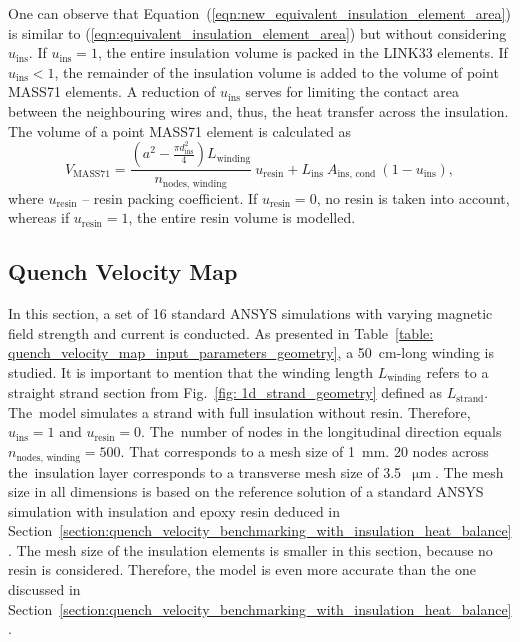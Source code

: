 One can observe that Equation~(\ref{eqn:new_equivalent_insulation_element_area}) is similar to (\ref{eqn:equivalent_insulation_element_area}) but without considering $u_\text{ins}$. If $u_\text{ins} = 1$, the entire insulation volume is packed in the LINK33 elements. If $u_\text{ins} < 1$, the remainder of the insulation volume is added to the volume of point MASS71 elements. A reduction of $u_\text{ins}$ serves for limiting the contact area between the neighbouring wires and, thus, the heat transfer across the insulation. The volume of a point MASS71 element is calculated as 
\begin{equation}
    V_\text{MASS71} = \frac{\left( a^2 - \frac{\pi d_\text{ins}^2}{4} \right) L_\text{winding}}{n_\text{nodes, winding}}~u_\text{resin} + L_\text{ins}~A_\text{ins, cond} ~ \left( 1-u_\text{ins} \right),
    \label{eqn:mass71_volume_element}
\end{equation}
where $u_\text{resin}$ -- resin packing coefficient. If $u_\text{resin} = 0$, no resin is taken into account, whereas if $u_\text{resin} = 1$, the entire resin volume is modelled.

\subsection{Quench Velocity Map}

In this section, a set of 16 standard ANSYS simulations with varying magnetic field strength and current is conducted. As presented in Table~\ref{table: quench_velocity_map_input_parameters_geometry}, a 50~cm-long winding is studied. It is important to mention that the winding length $L_\text{winding}$ refers to a straight strand section from Fig.~\ref{fig: 1d_strand_geometry} defined as $L_\text{strand}$. The~model simulates a strand with full insulation without resin. Therefore, $u_\text{ins}=1$ and $u_\text{resin}=0$. The~number of nodes in the longitudinal direction equals $n_\text{nodes, winding}=500$. That corresponds to a mesh size of 1~mm. 20 nodes across the~insulation layer corresponds to a transverse mesh size of 3.5~$\upmu \text{m}$. The mesh size in all dimensions is based on the reference solution of a standard ANSYS simulation with insulation and epoxy resin deduced in Section~\ref{section:quench_velocity_benchmarking_with_insulation_heat_balance}. The mesh size of the insulation elements is smaller in this section, because no resin is considered. Therefore, the model is even more accurate than the one discussed in Section~\ref{section:quench_velocity_benchmarking_with_insulation_heat_balance}.  

